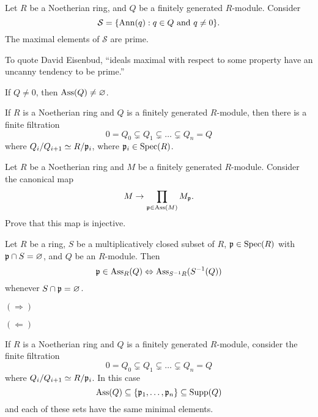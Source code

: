 \documentclass{ximera}
\begin{document}
\begin{proposition}
  Let $R$ be a Noetherian ring, and $Q$ be a finitely generated $R$-module. Consider
  \[
  \mathcal{S} = \{\operatorname{Ann}(q): q\in Q\text{ and } q\ne0\}.
  \]
  The maximal elements of $\mathcal{S}$ are prime.
  \begin{sketch}
  \end{sketch}
\end{proposition}

To quote David Eisenbud, ``ideals maximal with respect to some
property have an uncanny tendency to be prime.''


\begin{corollary}
  If $Q\ne 0$, then $\operatorname{Ass}(Q) \ne \varnothing$.
\end{corollary}

\begin{corollary}
  If $R$ is a Noetherian ring and $Q$ is a finitely generated
  $R$-module, then there is a finite filtration
  \[
  0 = Q_0 \subsetneq Q_1 \subsetneq \dots \subsetneq Q_n = Q 
  \]
  where $Q_i/Q_{i+1} \simeq R/\mathfrak{p}_i$, where $\mathfrak{p}_i\in\operatorname{Spec}(R)$.
\end{corollary}

\begin{exercise}
  Let $R$ be a Noetherian ring and $M$ be a finitely generated $R$-module. Consider the canonical map
  \[
  M\to \prod_{\mathfrak{p}\in\operatorname{Ass}(M)} M_{\mathfrak{p}}.
  \]
  Prove that this map is injective.
\end{exercise}



\begin{proposition}
  Let $R$ be a ring, $S$ be a multiplicatively closed subset of $R$,
  $\mathfrak{p}\in\operatorname{Spec}(R)$ with $\mathfrak{p}\cap S = \varnothing$, and $Q$ be an
  $R$-module. Then
  \[
  \mathfrak{p} \in \operatorname{Ass}_R(Q) \Leftrightarrow \operatorname{Ass}_{S^{-1}R}(S^{-1}(Q))
  \]
  whenever $S\cap\mathfrak{p} = \varnothing$.
  \begin{sketch}
    $(\Rightarrow)$

    $(\Leftarrow)$
  \end{sketch}
\end{proposition}



\begin{theorem}
  If $R$ is a Noetherian ring and $Q$ is a finitely generated
  $R$-module, consider the finite filtration
  \[
  0 = Q_0 \subsetneq Q_1 \subsetneq \dots \subsetneq Q_n = Q 
  \]
  where $Q_i/Q_{i+1} \simeq R/\mathfrak{p}_i$. In this case
  \[
  \operatorname{Ass}(Q) \subseteq \{\mathfrak{p}_1,\dots,\mathfrak{p}_n\}\subseteq \operatorname{Supp}(Q)
  \]
  and each of these sets have the same minimal elements.
\end{theorem}
\end{document}
